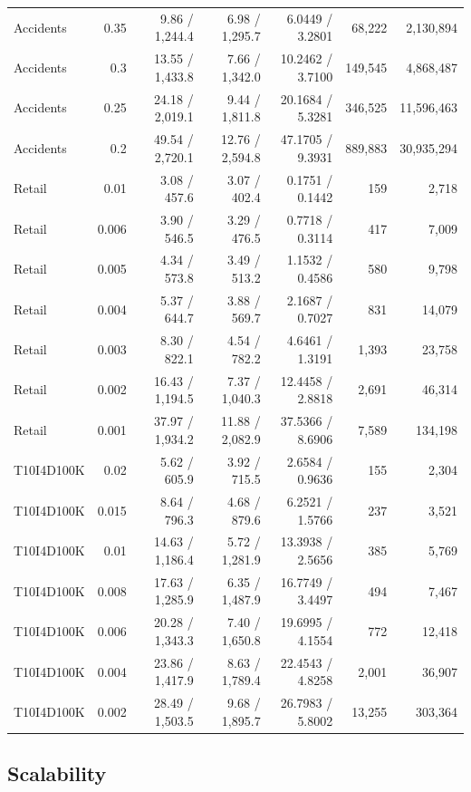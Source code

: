 \begin{table}[!t]
\begin{tabular}{lrrrrrr}
Accidents & 0.35 & 9.86 / 1,244.4 & 6.98 / 1,295.7 & 6.0449 / 3.2801 & 68,222 & 2,130,894 \\
Accidents & 0.3 & 13.55 / 1,433.8 & 7.66 / 1,342.0 & 10.2462 / 3.7100 & 149,545 & 4,868,487 \\
Accidents & 0.25 & 24.18 / 2,019.1 & 9.44 / 1,811.8 & 20.1684 / 5.3281 & 346,525 & 11,596,463 \\
Accidents & 0.2 & 49.54 / 2,720.1 & 12.76 / 2,594.8 & 47.1705 / 9.3931 & 889,883 & 30,935,294 \\
Retail & 0.01 & 3.08 / 457.6 & 3.07 / 402.4 & 0.1751 / 0.1442 & 159 & 2,718 \\
Retail & 0.006 & 3.90 / 546.5 & 3.29 / 476.5 & 0.7718 / 0.3114 & 417 & 7,009 \\
Retail & 0.005 & 4.34 / 573.8 & 3.49 / 513.2 & 1.1532 / 0.4586 & 580 & 9,798 \\
Retail & 0.004 & 5.37 / 644.7 & 3.88 / 569.7 & 2.1687 / 0.7027 & 831 & 14,079 \\
Retail & 0.003 & 8.30 / 822.1 & 4.54 / 782.2 & 4.6461 / 1.3191 & 1,393 & 23,758 \\
Retail & 0.002 & 16.43 / 1,194.5 & 7.37 / 1,040.3 & 12.4458 / 2.8818 & 2,691 & 46,314 \\
Retail & 0.001 & 37.97 / 1,934.2 & 11.88 / 2,082.9 & 37.5366 / 8.6906 & 7,589 & 134,198 \\
T10I4D100K & 0.02 & 5.62 / 605.9 & 3.92 / 715.5 & 2.6584 / 0.9636 & 155 & 2,304 \\
T10I4D100K & 0.015 & 8.64 / 796.3 & 4.68 / 879.6 & 6.2521 / 1.5766 & 237 & 3,521 \\
T10I4D100K & 0.01 & 14.63 / 1,186.4 & 5.72 / 1,281.9 & 13.3938 / 2.5656 & 385 & 5,769 \\
T10I4D100K & 0.008 & 17.63 / 1,285.9 & 6.35 / 1,487.9 & 16.7749 / 3.4497 & 494 & 7,467 \\
T10I4D100K & 0.006 & 20.28 / 1,343.3 & 7.40 / 1,650.8 & 19.6995 / 4.1554 & 772 & 12,418 \\
T10I4D100K & 0.004 & 23.86 / 1,417.9 & 8.63 / 1,789.4 & 22.4543 / 4.8258 & 2,001 & 36,907 \\
T10I4D100K & 0.002 & 28.49 / 1,503.5 & 9.68 / 1,895.7 & 26.7983 / 5.8002 & 13,255 & 303,364 \\
\hline
\end{tabular}
\end{table}

\subsection{Scalability}

